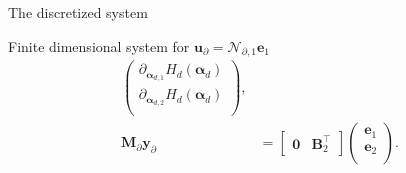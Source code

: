 \documentclass[aspectratio=169]{ISAE-Beamer}
\begin{document}
\begin{frame}{The discretized system}
{\begin{exampleblock}{Finite dimensional system for $\bm{u}_\partial = \mathcal{N}_{\partial, 1} \displaystyle \bm{e}_1$}
\begin{equation*}
\begin{aligned}
\begin{pmatrix}
	\partial_{\bm{\alpha}_{d, 1}} H_d(\bm{\alpha}_d)\\
	\partial_{\bm{\alpha}_{d, 2}} H_d(\bm{\alpha}_d)\\
	\end{pmatrix}, \\
	\mathbf{M}_\partial {\mathbf{y}_\partial} &= 
	\begin{bmatrix}
	\mathbf{0} & \mathbf{B}_2^\top 
	\end{bmatrix}\begin{pmatrix}
	\mathbf{e}_{1} \\
	\mathbf{e}_{2} \\
	\end{pmatrix}.
	\end{aligned}
	\end{equation*}
\end{exampleblock}
}


\end{frame}
\end{document}
